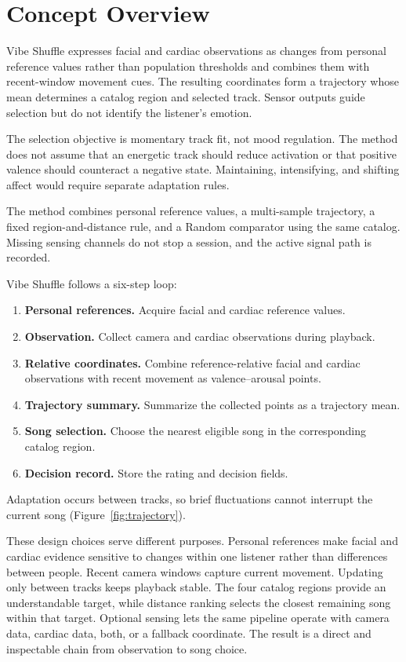 \section{Concept Overview}
\label{sec:concept}

Vibe Shuffle expresses facial and cardiac observations as changes from personal
reference values rather than population thresholds and combines them with
recent-window movement cues. The resulting coordinates form a trajectory whose
mean determines a catalog region and selected track.
Sensor outputs guide selection but do not identify the listener's emotion.

The selection objective is momentary track fit, not mood regulation. The method
does not assume that an energetic track should reduce activation or that
positive valence should counteract a negative state. Maintaining, intensifying,
and shifting affect would require separate adaptation rules.

The method combines personal reference values, a multi-sample trajectory, a
fixed region-and-distance rule, and a Random comparator using the same catalog.
Missing sensing channels do not stop a session, and the active signal path is
recorded.

Vibe Shuffle follows a six-step loop:
\begin{enumerate}
  \setlength{\itemsep}{0pt}
  \setlength{\parsep}{0pt}
  \setlength{\topsep}{3pt}
  \item \textbf{Personal references.} Acquire facial and cardiac reference
  values.
  \item \textbf{Observation.} Collect camera and cardiac observations during
  playback.
  \item \textbf{Relative coordinates.} Combine reference-relative facial and
  cardiac observations with recent movement as valence--arousal points.
  \item \textbf{Trajectory summary.} Summarize the collected points as a
  trajectory mean.
  \item \textbf{Song selection.} Choose the nearest eligible song in the
  corresponding catalog region.
  \item \textbf{Decision record.} Store the rating and decision fields.
\end{enumerate}
Adaptation occurs between tracks, so brief fluctuations cannot interrupt the
current song (Figure~\ref{fig:trajectory}).

These design choices serve different purposes. Personal references make facial
and cardiac evidence sensitive to changes within one listener rather than
differences between people. Recent camera windows capture current movement.
Updating only between tracks keeps playback stable. The four catalog
regions provide an understandable target, while distance ranking selects the
closest remaining song within that target. Optional sensing lets the same
pipeline operate with camera data, cardiac data, both, or a fallback coordinate.
The result is a direct and inspectable chain from observation to song choice.

